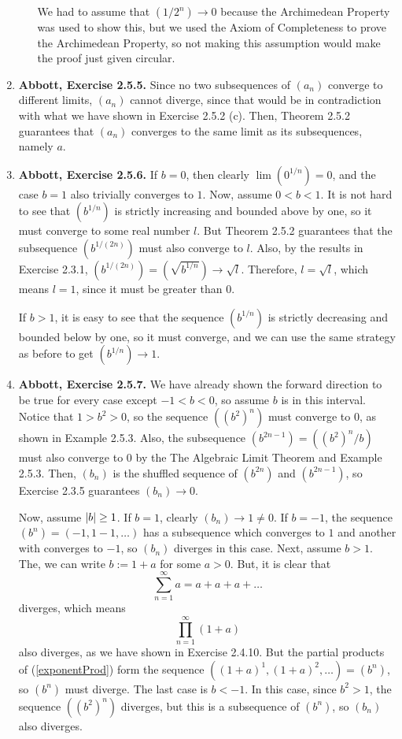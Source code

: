 \documentclass{article}
\DeclarePairedDelimiter\abs{\lvert}{\rvert}
\newcommand{\ra}{\rightarrow}
\newcommand{\exc}[2][Abbott]{\item \textbf{#1, Exercise #2.}}
\begin{document}
\begin{enumerate}
\begin{enumerate}
        We had to assume that $(1/2^n) \ra 0$ because the Archimedean Property was used to show this, but we used the Axiom of Completeness to prove the Archimedean Property, so not making this assumption would make the proof just given circular.
    \end{enumerate}
    
    \exc{2.5.5}
    Since no two subsequences of $(a_n)$ converge to different limits, $(a_n)$ cannot diverge, since that would be in contradiction with what we have shown in Exercise 2.5.2 (c). Then, Theorem 2.5.2 guarantees that $(a_n)$ converges to the same limit as its subsequences, namely $a$.
    
    \exc{2.5.6}
    If $b = 0$, then clearly $\lim(0^{1/n}) = 0$, and the case $b=1$ also trivially converges to $1$. Now, assume $0 < b < 1$. It is not hard to see that $(b^{1/n})$ is strictly increasing and bounded above by one, so it must converge to some real number $l$. But Theorem 2.5.2 guarantees that the subsequence $(b^{1/(2n)})$ must also converge to $l$. Also, by the results in Exercise 2.3.1, $(b^{1/(2n)}) = (\sqrt{b^{1/n}}) \ra \sqrt{l}$. Therefore, $l = \sqrt{l}$, which means $l = 1$, since it must be greater than 0.
    
    If $b > 1$, it is easy to see that the sequence $(b^{1/n})$ is strictly decreasing and bounded below by one, so it must converge, and we can use the same strategy as before to get $(b^{1/n}) \ra 1$.
    
    \exc{2.5.7}
     We have already shown the forward direction to be true for every case except $-1 < b < 0$, so assume $b$ is in this interval. Notice that $1 > b^2 > 0$, so the sequence $((b^2)^n)$ must converge to $0$, as shown in Example 2.5.3. Also, the subsequence $(b^{2n-1}) = ((b^2)^n/b)$ must also converge to $0$ by the The Algebraic Limit Theorem and Example 2.5.3. Then, $(b_n)$ is the shuffled sequence of $(b^{2n})$ and $(b^{2n-1})$, so Exercise 2.3.5 guarantees $(b_n) \ra 0$.
    
    Now, assume $\abs{b} \geq 1$. If $b = 1$, clearly $(b_n) \ra 1 \neq 0$. If $b = -1$, the sequence $(b^n) = (-1,1-1,\dots)$ has a subsequence which converges to $1$ and another with converges to $-1$, so $(b_n)$ diverges in this case. Next, assume $b > 1$. The, we can write $b := 1 + a$ for some $a > 0$. But, it is clear that 
    \begin{equation*}
        \sum_{n=1}^\infty a = a + a + a + \dots
    \end{equation*} diverges, which means
    \begin{equation} \label{exponentProd}
        \prod_{n=1}^\infty (1+a)
    \end{equation} also diverges, as we have shown in Exercise 2.4.10. But the partial products of (\ref{exponentProd}) form the sequence $((1+a)^1, (1+a)^2, \dots) = (b^n)$, so $(b^n)$ must diverge. The last case is $b < -1$. In this case, since $b^2 > 1$, the sequence $((b^2)^n)$ diverges, but this is a subsequence of $(b^n)$, so $(b_n)$ also diverges.
    

\end{enumerate}
\end{document}
